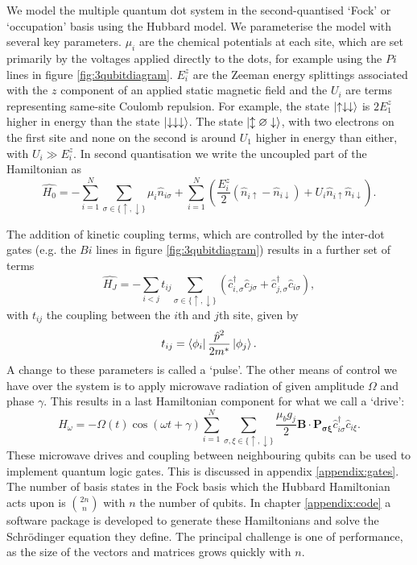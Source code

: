 \documentclass{report}
\begin{document}
\begin{appendices}
We model the multiple quantum dot system in the second-quantised `Fock' or `occupation' basis using the Hubbard model\cite{Hubbard1963}. 
We parameterise the model with several key parameters. $\mu_i$ are the chemical potentials at each site, which are set primarily by the voltages applied directly to the dots, for example using the $Pi$ lines in figure \ref{fig:3qubitdiagram}. $E^z_i$ are the Zeeman energy splittings associated with the $z$ component of an applied static magnetic field and the $U_i$ are terms representing same-site Coulomb repulsion. For example, the state $\ket{\uparrow\downarrow\downarrow}$ is $2E_1^z$ higher in energy than the state $\ket{\downarrow\downarrow\downarrow}$. The state $\ket{\updownarrow\varnothing\downarrow}$, with two electrons on the first site and none on the second is around $U_1$ higher in energy than either, with $U_i \gg E_i^z$. In second quantisation we write the uncoupled part of the Hamiltonian as
\begin{equation*}
    \hat{H_0} = -\sum_{i = 1}^{N}{\sum_{\sigma \in \{\uparrow, \downarrow\}}{\mu_i\hat{n}_{i\sigma}}}
    +\sum_{i = 1}^{N}{(\frac{E_i^z}{2} (\hat{n}_{i\uparrow} - \hat{n}_{i\downarrow}) 
    + U_i \hat{n}_{i\uparrow} \hat{n}_{i\downarrow}) }.
\end{equation*}

The addition of kinetic coupling terms, which are controlled by the inter-dot gates (e.g. the $Bi$ lines in figure \ref{fig:3qubitdiagram}) results in a further set of terms
\begin{equation*}
    \hat{H_J} = -\sum_{i < j}t_{ij}{\sum_{\sigma \in \{\uparrow, \downarrow\}}
    (\hat{c}_{i,\sigma}^\dag \hat{c}_{j\sigma} + \hat{c}_{j,\sigma}^\dag \hat{c}_{i\sigma})},
\end{equation*} with $t_{ij}$ the coupling between the $i$th and $j$th site, given by\begin{equation*}
    t_{ij} = \bra{\phi_i}\frac{\hat{p}^2}{2m^*}\ket{\phi_j}.
\end{equation*} A change to these parameters is called a `pulse'. The other means of control we have over the system is to apply microwave radiation of given amplitude $\Omega$ and phase $\gamma$. This results in a last Hamiltonian component for what we call a `drive':
\begin{equation*}
    \hat{H}_\omega = -\Omega(t)\cos(\omega t + \gamma) \sum_{i = 1}^{N}\sum_{\sigma,\xi \in \{\uparrow, \downarrow\}}
    \frac{\mu_b g_j}{2}\mathbf{B}\cdot\mathbf{P_{\sigma\xi}}\hat{c}^\dag_{i\sigma}\hat{c}_{i\xi}.
\end{equation*}
These microwave drives and coupling between neighbouring qubits can be used to implement quantum logic gates. This is discussed in appendix \ref{appendix:gates}.
The number of basis states in the Fock basis which the Hubbard Hamiltonian acts upon is $\binom{2n}{n}$ with $n$ the number of qubits. In chapter \ref{appendix:code} a software package is developed to generate these Hamiltonians and solve the Schrödinger equation they define. The principal challenge is one of performance, as the size of the vectors and matrices grows quickly with $n$.
    

\end{appendices}
\end{document}
